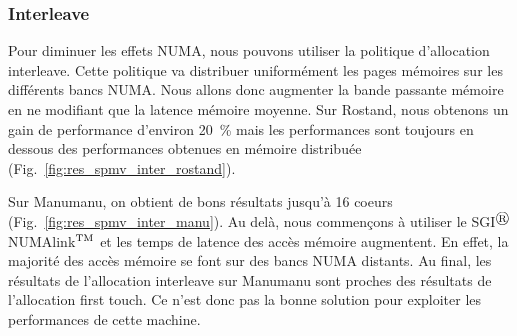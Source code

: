 \subsubsection{Interleave}
Pour diminuer les effets NUMA, nous pouvons utiliser la politique d'allocation interleave.
%
Cette politique va distribuer uniformément les pages mémoires sur les différents bancs NUMA.
%
Nous allons donc augmenter la bande passante mémoire en ne modifiant que la latence mémoire moyenne.
%
Sur Rostand, nous obtenons un gain de performance d'environ 20~\% mais les performances sont toujours en dessous des performances obtenues en mémoire distribuée (Fig.~\ref{fig:res_spmv_inter_rostand}).



Sur Manumanu, on obtient de bons résultats jusqu'à 16 coeurs (Fig.~\ref{fig:res_spmv_inter_manu}).
%
Au delà, nous commençons à utiliser le SGI$^\registered$ NUMAlink$^{\rm TM}$\cite{numalink} et les temps de latence des accès mémoire augmentent.
%
En effet, la majorité des accès mémoire se font sur des bancs NUMA distants.
%
Au final, les résultats de l'allocation interleave sur Manumanu sont proches des résultats de l'allocation first touch.
%
Ce n'est donc pas la bonne solution pour exploiter les performances de cette machine.
